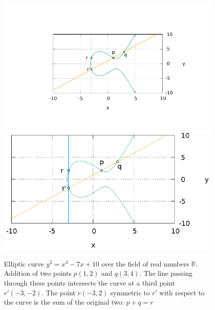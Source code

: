 \begin{figure}
\centering
\ifpdf
\includegraphics[angle=0,scale=1.5]
{./add/discretmath/picellipticsum.pdf}
\else
\includegraphics[angle=0,scale=1.5]
{./add/discretmath/picellipticsum.eps}
\fi
\caption{Elliptic curve $y^2 = x^3 -7 x + 10$ over the field of
  real numbers $\mathbb{R}$. Addition of two points $p(1,2)$ and
  $q(3,4)$. The line passing through these points intersects the curve at
  a third point $r'(-3,-2)$. The point $r(-3,2)$ symmetric to $r'$
  with respect to the curve is the sum of the original two: $p + q = r$}
\label{fig:add:ellipticRsum}
\end{figure}